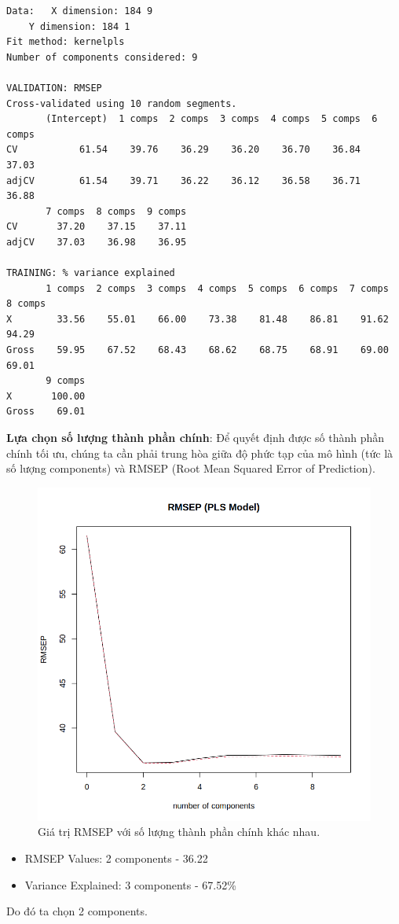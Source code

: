 \begin{lstlisting}
Data: 	X dimension: 184 9 
	Y dimension: 184 1
Fit method: kernelpls
Number of components considered: 9

VALIDATION: RMSEP
Cross-validated using 10 random segments.
       (Intercept)  1 comps  2 comps  3 comps  4 comps  5 comps  6 comps
CV           61.54    39.76    36.29    36.20    36.70    36.84    37.03
adjCV        61.54    39.71    36.22    36.12    36.58    36.71    36.88
       7 comps  8 comps  9 comps
CV       37.20    37.15    37.11
adjCV    37.03    36.98    36.95

TRAINING: % variance explained
       1 comps  2 comps  3 comps  4 comps  5 comps  6 comps  7 comps  8 comps
X        33.56    55.01    66.00    73.38    81.48    86.81    91.62    94.29
Gross    59.95    67.52    68.43    68.62    68.75    68.91    69.00    69.01
       9 comps
X       100.00
Gross    69.01
\end{lstlisting}

\textbf{Lựa chọn số lượng thành phần chính}: Để quyết định được số thành phần chính tối ưu, chúng ta cần phải trung hòa giữa độ phức tạp của mô hình (tức là số lượng components) và RMSEP (Root Mean Squared Error of Prediction).

\begin{figure}[H]
    \centering
    \includegraphics[width=0.75\columnwidth]{csm_figures/pls_part01.png}
    \caption{Giá trị RMSEP với số lượng thành phần chính khác nhau.}
    \label{fig:pls_part01}
\end{figure}

\begin{itemize}
    \item RMSEP Values: 2 components - 36.22
    \item Variance Explained: 3 components - 67.52\% 
\end{itemize}
Do đó ta chọn 2 components.

